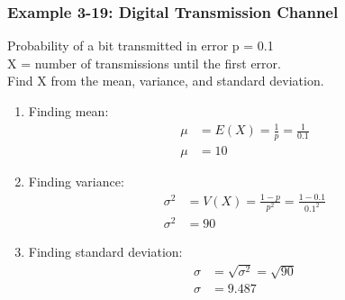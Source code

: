\documentclass[../INDE315.tex]{subfiles}
\begin{document}
\subsubsection*{Example 3-19: Digital Transmission Channel}
\begin{exmp}
    Probability of a bit transmitted in error p = 0.1 \\
    X = number of transmissions until the first error. \\
    Find X from the mean, variance, and standard deviation.
\end{exmp}
\begin{enumerate}
    \item Finding mean:
        \begin{equation*}
            \begin{aligned}
                \mu &= E(X) = \frac{1}{p} = \frac{1}{0.1} \\
                \mu &= 10
            \end{aligned}
        \end{equation*}
    \item Finding variance:
        \begin{equation*}
            \begin{aligned}
                \sigma ^2 &= V(X) = \frac{1-p}{p^2} = \frac{1-0.1}{0.1^2} \\
                \sigma ^2 &= 90
            \end{aligned}
        \end{equation*}
    \item Finding standard deviation:
        \begin{equation*}
            \begin{aligned}
                \sigma &= \sqrt{\sigma ^2} = \sqrt{90} \\
                \sigma &= 9.487
            \end{aligned}
        \end{equation*}
\end{enumerate}
\end{document}
